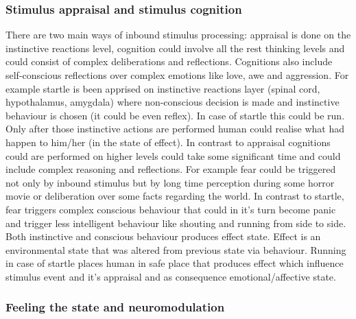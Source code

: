 \subsubsection{Stimulus appraisal and stimulus cognition}

There are two main ways of inbound stimulus processing: appraisal is done on the instinctive reactions level, cognition could involve all the rest thinking levels and could consist of complex deliberations and reflections.
Cognitions also include self-conscious reflections over complex emotions like love, awe and aggression. For example startle is been apprised on instinctive reactions layer (spinal cord, hypothalamus, amygdala) where non-conscious decision is made and instinctive behaviour is chosen (it could be even reflex). In case of startle this could be run. Only after those instinctive actions are performed human could realise what had happen to him/her (in the state of effect). In contrast to appraisal cognitions could are performed on higher levels could take some significant time and could include complex reasoning and reflections. For example fear could be triggered not only by inbound stimulus but by long time perception during some horror movie or deliberation over some facts regarding the world. In contrast to startle, fear triggers complex conscious behaviour that could in it's turn become panic and trigger less intelligent behaviour like shouting and running from side to side. Both instinctive and conscious behaviour produces effect state. Effect is an environmental state that was altered from previous state via behaviour. Running in case of startle places human in safe place that produces effect which influence stimulus event and it's appraisal and as consequence emotional/affective state.

\subsubsection{Feeling the state and neuromodulation}


